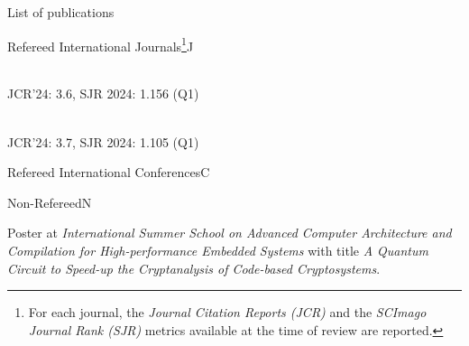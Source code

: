 \documentclass[
	a4paper, %
	10pt, %
]{tresume} %
\begin{document}
\begin{tSection}{List of publications}

  \begin{tSubPublications}{Refereed International
      Journals\footnote{\label{fn:journal}For each journal, the \emph{Journal
          Citation Reports (JCR)} and the \emph{SCImago Journal Rank
          (SJR)} metrics available at the time of review are reported.}}{J}
  \item {}\\JCR'24: 3.6, SJR 2024: 1.156 (Q1)
  \item {}\\JCR'24: 3.7, SJR 2024: 1.105 (Q1)
  \end{tSubPublications}
  \begin{tSubPublications}{Refereed International Conferences}{C}
  \item {}
  \item {}
  \item {}
  \item {}
  \item {}
  \item {}
  \end{tSubPublications}
  \begin{tSubPublications}{Non-Refereed}{N}
  \item Poster at \emph{International Summer School on Advanced
      Computer Architecture and Compilation for High-performance Embedded
      Systems} with title \emph{A Quantum Circuit to Speed-up the Cryptanalysis
      of Code-based Cryptosystems}.
  \end{tSubPublications}
\end{tSection}
%
\end{document}
